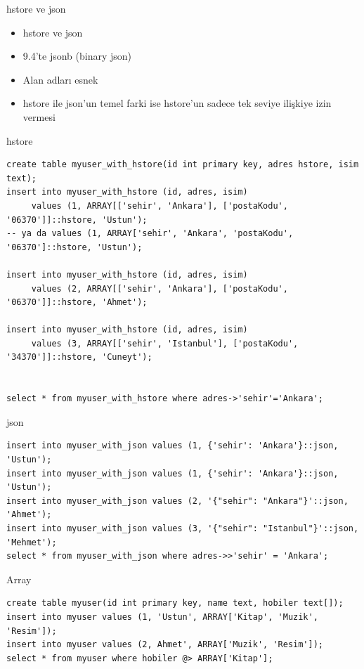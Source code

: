 \documentclass[presentation]{beamer}
\begin{document}
\begin{frame}[label=sec-24]{hstore ve json}
\begin{itemize}
\item hstore ve json
\item 9.4'te jsonb (binary json)
\item Alan adları esnek
\item hstore ile json'un temel farki ise hstore'un sadece tek seviye ilişkiye izin
vermesi
\end{itemize}
\end{frame}

\begin{frame}[fragile,label=sec-25]{hstore}
 \begin{verbatim}
create table myuser_with_hstore(id int primary key, adres hstore, isim text);
insert into myuser_with_hstore (id, adres, isim)
     values (1, ARRAY[['sehir', 'Ankara'], ['postaKodu', '06370']]::hstore, 'Ustun');
-- ya da values (1, ARRAY['sehir', 'Ankara', 'postaKodu', '06370']::hstore, 'Ustun');

insert into myuser_with_hstore (id, adres, isim)
     values (2, ARRAY[['sehir', 'Ankara'], ['postaKodu', '06370']]::hstore, 'Ahmet');

insert into myuser_with_hstore (id, adres, isim)
     values (3, ARRAY[['sehir', 'Istanbul'], ['postaKodu', '34370']]::hstore, 'Cuneyt');


select * from myuser_with_hstore where adres->'sehir'='Ankara';
\end{verbatim}
\end{frame}

\begin{frame}[fragile,label=sec-26]{json}
 \begin{verbatim}
insert into myuser_with_json values (1, {'sehir': 'Ankara'}::json, 'Ustun');
insert into myuser_with_json values (1, {'sehir': 'Ankara'}::json, 'Ustun');
insert into myuser_with_json values (2, '{"sehir": "Ankara"}'::json, 'Ahmet');
insert into myuser_with_json values (3, '{"sehir": "Istanbul"}'::json, 'Mehmet');
select * from myuser_with_json where adres->>'sehir' = 'Ankara';
\end{verbatim}
\end{frame}


\begin{frame}[fragile,label=sec-27]{Array}
 \begin{verbatim}
create table myuser(id int primary key, name text, hobiler text[]);
insert into myuser values (1, 'Ustun', ARRAY['Kitap', 'Muzik', 'Resim']);
insert into myuser values (2, Ahmet', ARRAY['Muzik', 'Resim']);
select * from myuser where hobiler @> ARRAY['Kitap'];
\end{verbatim}
\end{frame}
\end{document}
